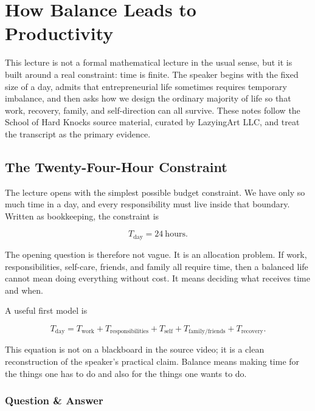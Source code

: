 \chapter{How Balance Leads to Productivity}

This lecture is not a formal mathematical lecture in the usual sense, but it is built around a real constraint: time is finite. The speaker begins with the fixed size of a day, admits that entrepreneurial life sometimes requires temporary imbalance, and then asks how we design the ordinary majority of life so that work, recovery, family, and self-direction can all survive. These notes follow the School of Hard Knocks source material, curated by LazyingArt LLC, and treat the transcript as the primary evidence.

\section{The Twenty-Four-Hour Constraint}

The lecture opens with the simplest possible budget constraint. We have only so much time in a day, and every responsibility must live inside that boundary. Written as bookkeeping, the constraint is

\begin{equation}
T_{\mathrm{day}} = 24\ \mathrm{hours}.
\end{equation}

The opening question is therefore not vague. It is an allocation problem. If work, responsibilities, self-care, friends, and family all require time, then a balanced life cannot mean doing everything without cost. It means deciding what receives time and when.

A useful first model is

\begin{equation}
T_{\mathrm{day}}
=
T_{\mathrm{work}}
+
T_{\mathrm{responsibilities}}
+
T_{\mathrm{self}}
+
T_{\mathrm{family/friends}}
+
T_{\mathrm{recovery}}.
\end{equation}

This equation is not on a blackboard in the source video; it is a clean reconstruction of the speaker's practical claim. Balance means making time for the things one has to do and also for the things one wants to do.

\subsection{Question \& Answer}

